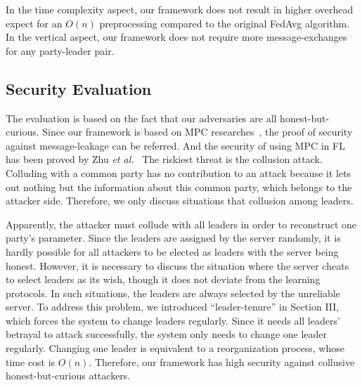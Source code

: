In the time complexity aspect, our framework does not result in higher overhead expect for an $O(n)$ preprocessing compared to the original FedAvg algorithm. In the vertical aspect, our framework does not require more message-exchanges for any party-leader pair. 

\subsection{Security Evaluation}
The evaluation is based on the fact that our adversaries are all honest-but-curious. Since our framework is based on MPC researches~\cite{Shamir,Du2001SecureMC,Three-Party}, the proof of security against message-leakage can be referred. And the security of using MPC in FL has been proved by Zhu \emph{et al.}~\cite{Weighted} The riskiest threat is the collusion attack. Colluding with a common party has no contribution to an attack because it lets out nothing but the information about this common party, which belongs to the attacker side. Therefore, we only discuss situations that collusion among leaders. 

Apparently, the attacker must collude with all leaders in order to reconstruct one party's parameter. Since the leaders are assigned by the server randomly, it is hardly possible for all attackers to be elected as leaders with the server being honest. However, it is necessary to discuss the situation where the server cheats to select leaders as its wish, though it does not deviate from the learning protocols. In such situations, the leaders are always selected by the unreliable server. To address this problem, we introduced ``leader-tenure'' in Section III, which forces the system to change leaders regularly. Since it needs all leaders' betrayal to attack successfully, the system only needs to change one leader regularly. Changing one leader is equivalent to a reorganization process, whose time cost is $O(n)$. Therefore, our framework has high security against collusive honest-but-curious attackers.
